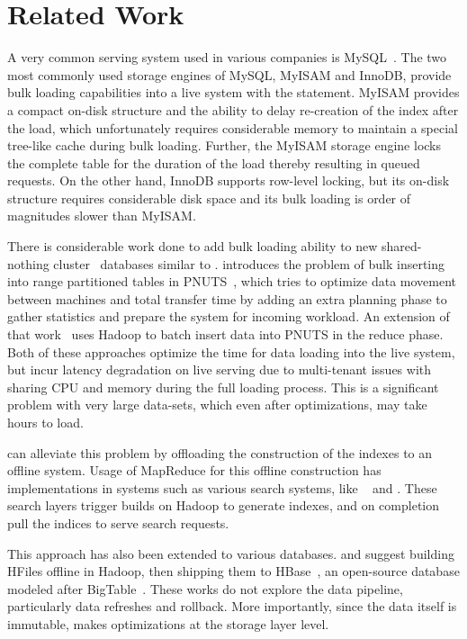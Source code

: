 \section{Related Work}
\label{sec:related_work}

A very common serving system used in various companies is
MySQL~\cite{mysql}. The two most commonly used storage engines of
MySQL, MyISAM and InnoDB, provide bulk loading capabilities into a
live system with the  statement. MyISAM provides
a compact on-disk structure and the ability to delay re-creation of
the index after the load, which unfortunately requires considerable
memory to maintain a special tree-like cache during bulk loading.
Further, the MyISAM storage engine locks the complete table for the
duration of the load thereby resulting in queued requests. On the
other hand, InnoDB supports row-level locking, but its on-disk
structure requires considerable disk space and its bulk loading is
order of magnitudes slower than MyISAM. 

There is considerable work done to add bulk loading ability to new
shared-nothing cluster~\cite{sharednothing} databases similar to
\projectname{}. \citet{silberstein} introduces the problem of bulk
inserting into range partitioned tables in PNUTS~\cite{pnuts}, which
tries to optimize data movement between machines and total transfer
time by adding an extra planning phase to gather statistics and
prepare the system for incoming workload. An extension of that
work~\citet{pnutsbatch} uses Hadoop to batch insert data into PNUTS in
the reduce phase. Both of these approaches optimize the time for data
loading into the live system, but incur latency degradation on live
serving due to multi-tenant issues with sharing CPU and memory during
the full loading process. This is a significant problem with very large
data-sets, which even after optimizations, may take hours to load.  

\projectname{} can alleviate this problem by offloading the
construction of the indexes to an offline system. Usage of MapReduce
for this offline construction has implementations in systems such as
various search systems, like ~\citet{dean} and \citet{mika}.
These search layers trigger builds on Hadoop to generate indexes, and
on completion pull the indices to serve search requests. 

This approach has also been extended to various databases.
\citet{konstantinou} and \citet{barbuzzi} suggest building HFiles
offline in Hadoop, then shipping them to HBase~\cite{hbase}, an
open-source database modeled after BigTable~\cite{bigtable}. These
works do not explore the data pipeline, particularly data refreshes
and rollback. More importantly, since the data itself is immutable,
\projectname{} makes optimizations at the storage layer level.

